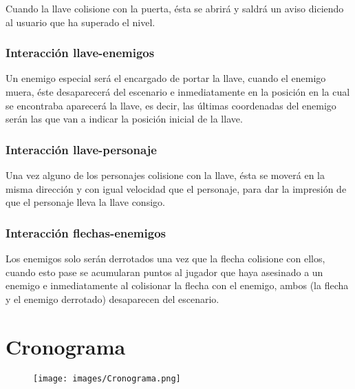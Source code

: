\documentclass{article}
\begin{document}
Cuando la llave colisione con la puerta, ésta se abrirá y saldrá un aviso diciendo al usuario que ha superado el nivel.


\subsubsection{Interacción llave-enemigos}

Un enemigo especial será el encargado de portar la llave, cuando el enemigo muera, éste desaparecerá del escenario e inmediatamente en la posición en la cual se encontraba aparecerá la llave, es decir, las últimas coordenadas del enemigo serán las que van a indicar la posición inicial de la llave.


\subsubsection{Interacción llave-personaje}

Una vez alguno de los personajes colisione con la llave, ésta se moverá en la misma dirección y con igual velocidad que el personaje, para dar la impresión de que el personaje lleva la llave consigo.


\subsubsection{Interacción flechas-enemigos}

Los enemigos solo serán derrotados una vez que la flecha colisione con ellos, cuando esto pase se acumularan puntos al jugador que haya asesinado a un enemigo e inmediatamente al colisionar la flecha con el enemigo, ambos (la flecha y el enemigo derrotado) desaparecen del escenario. 


\section{Cronograma} \label{Cronograma}

\begin{figure}[h!]
    \centering
    \texttt{[image: images/Cronograma.png]}
\end{figure}
\end{document}
